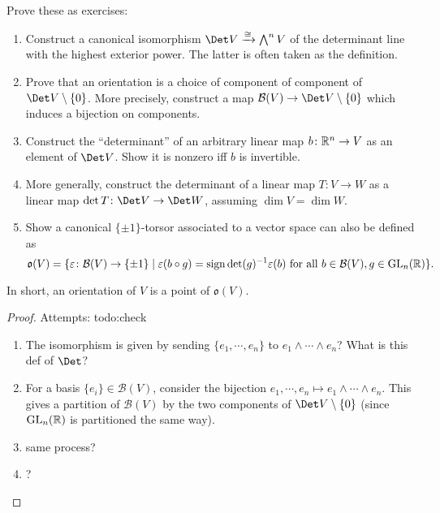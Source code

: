    \begin{remark}
       Prove these as exercises:
       \begin{enumerate}[label=(\roman*)]
       \setlength\itemsep{-.2em}
           \item Construct a canonical isomorphism $\Det V \xrightarrow{\cong} \bigwedge^n V$ of the determinant line with the highest exterior power. The latter is often taken as the definition. 
           \item Prove that an orientation is a choice of component of component of $\Det V \setminus \{0\} $. More precisely, construct a map $\mathcal{B} (V)\to \Det V \setminus \{0\} $ which induces a bijection on components.
            \item Construct the ``determinant'' of an arbitrary linear map $b \colon \mathbb{R}^n  \to V$ as an element of $\Det V$. Show it is nonzero iff $b$ is invertible. 
            \item More generally, construct the determinant of a linear map $T \colon V \to W$ as a linear map $\det T \colon \Det V \to \Det W$, assuming $\dim V=\dim W$.
            \item Show a canonical $\{\pm 1\} $-torsor associated to a vector space can also be defined as \[
                    \mathfrak o (V)= \{\varepsilon  \colon \mathcal{B} (V) \to \{\pm 1\}  \mid  \varepsilon (b \circ g) = \operatorname{sign}\det (g) ^{-1}\varepsilon (b) \ \text {for all}\ b \in \mathcal{B} (V), g \in \mathrm{GL}_n (\mathbb{R}) \} .
            \] 
       \end{enumerate}
       In short, an orientation of $V$ is a point of $\mathfrak o (V)$.
   \end{remark}
   \begin{proof}
       Attempts: {\color{red}todo:check} 
       \begin{enumerate}[label=(\roman*)]
       \setlength\itemsep{-.2em}
           \item The isomorphism is given by sending $\{e_1,\cdots ,e_n \} $ to $e_1 \wedge \cdots \wedge e_n $? What is this def of $\Det$?
           \item For a basis $\{e_i \} \in \mathcal{B} (V)$, consider the bijection $e_1, \cdots ,e_n  \mapsto e_1 \wedge \cdots \wedge e_n $. This gives a partition of $\mathcal{B} (V)$ by the two components of $\Det V \setminus \{0\} $ (since $\mathrm{GL}_n (\mathbb{R})$ is partitioned the same way).
            \item same process?
            \item ?
       \end{enumerate}
   \end{proof}
